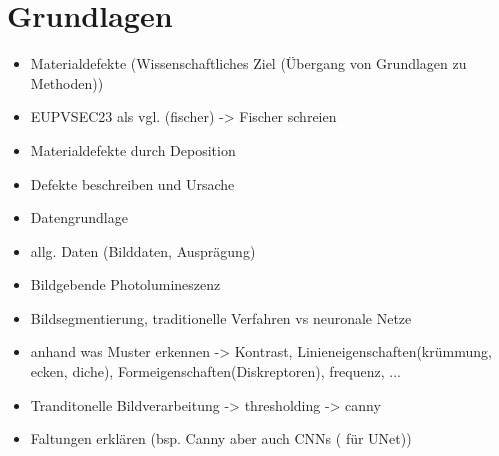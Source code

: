 \chapter{Grundlagen}
\label{chap:grundlagen}
\iffalse
\begin{itemize}

    \item Materialdefekte (Wissenschaftliches Ziel (Übergang von Grundlagen zu Methoden))
        \item EUPVSEC23 als vgl. (fischer) -> Fischer schreien
        \item Materialdefekte durch Deposition 
        \item Defekte beschreiben und Ursache
        
    \item Datengrundlage 
        \item allg. Daten (Bilddaten, Ausprägung)
        \item Bildgebende Photolumineszenz     

    \item Bildsegmentierung, traditionelle Verfahren vs neuronale Netze
        \item anhand was Muster erkennen -> Kontrast, Linieneigenschaften(krümmung, ecken, diche), Formeigenschaften(Diskreptoren), frequenz, ... 
        
    \item Tranditonelle Bildverarbeitung -> thresholding -> canny  
        \item Faltungen erklären (bsp. Canny aber auch CNNs ( für UNet))
        

\end{itemize}
